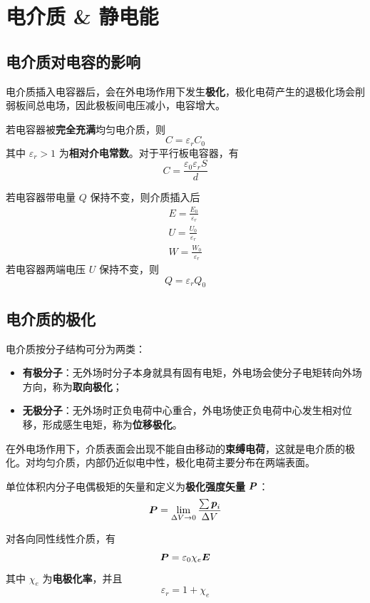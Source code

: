 \section{电介质 \& 静电能}

\subsection{电介质对电容的影响}

电介质插入电容器后，会在外电场作用下发生\textbf{极化}，极化电荷产生的退极化场会削弱板间总电场，因此极板间电压减小，电容增大。

若电容器被\textbf{完全充满}均匀电介质，则
$$
C = \varepsilon_r C_0
$$
其中 $\varepsilon_r > 1$ 为\textbf{相对介电常数}。对于平行板电容器，有
$$
C = \frac{\varepsilon_0 \varepsilon_r S}{d}
$$

若电容器带电量 $Q$ 保持不变，则介质插入后
$$
\begin{gathered}
	E = \frac{E_0}{\varepsilon_r} \\
	U = \frac{U_0}{\varepsilon_r} \\
	W = \frac{W_0}{\varepsilon_r}
\end{gathered}
$$
若电容器两端电压 $U$ 保持不变，则
$$
Q = \varepsilon_r Q_0
$$

\subsection{电介质的极化}

电介质按分子结构可分为两类：
\begin{itemize}
	\item \textbf{有极分子}：无外场时分子本身就具有固有电矩，外电场会使分子电矩转向外场方向，称为\textbf{取向极化}；
	\item \textbf{无极分子}：无外场时正负电荷中心重合，外电场使正负电荷中心发生相对位移，形成感生电矩，称为\textbf{位移极化}。
\end{itemize}

在外电场作用下，介质表面会出现不能自由移动的\textbf{束缚电荷}，这就是电介质的极化。对均匀介质，内部仍近似电中性，极化电荷主要分布在两端表面。

\begin{definition}[极化强度矢量]
	单位体积内分子电偶极矩的矢量和定义为\textbf{极化强度矢量} $\boldsymbol{P}$：
	$$
	\boldsymbol{P} = \lim_{\Delta V \to 0} \frac{\sum \boldsymbol{p}_i}{\Delta V}
	$$
\end{definition}

对各向同性线性介质，有
$$
\boldsymbol{P} = \varepsilon_0 \chi_e \boldsymbol{E}
$$
其中 $\chi_e$ 为\textbf{电极化率}，并且
$$
\varepsilon_r = 1 + \chi_e
$$

